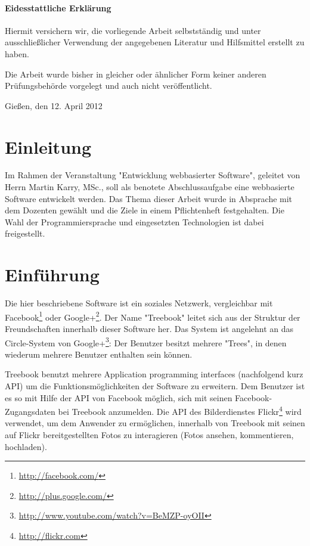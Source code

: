 \documentclass[10pt,a4paper]{book}
\begin{document}
\begin{titlepage}
\subsubsection{Eidesstattliche Erklärung}
Hiermit versichern wir, die vorliegende Arbeit selbstständig und unter ausschließlicher Verwendung der angegebenen Literatur und Hilfsmittel erstellt zu haben.

Die Arbeit wurde bisher in gleicher oder ähnlicher Form keiner anderen Prüfungsbehörde vorgelegt und auch nicht veröffentlicht.

\bigskip
\bigskip
\bigskip
\bigskip
\bigskip
Gießen, den 12. April 2012
\end{titlepage}
\setcounter{page}{1}

\tableofcontents
\renewcommand{\chaptername}{}
\renewcommand{\thechapter}{}
\renewcommand{\thesection}{\arabic{section}}
\renewcommand{\thefigure}{\arabic{figure}}

\chapter{Einleitung}
Im Rahmen der Veranstaltung "Entwicklung webbasierter Software", geleitet von Herrn Martin Karry, MSc., soll als benotete Abschlussaufgabe eine webbasierte Software entwickelt werden. Das Thema dieser Arbeit wurde in Absprache mit dem Dozenten gewählt und die Ziele in einem Pflichtenheft festgehalten. Die Wahl der Programmiersprache und eingesetzten Technologien ist dabei freigestellt.
\chapter{Einführung}
Die hier beschriebene Software ist ein soziales Netzwerk, vergleichbar mit Facebook\footnote{\href{http://facebook.com/}{http://facebook.com/}
} oder Google+\footnote{\href{http://plus.google.com/}{http://plus.google.com/}}. Der Name "Treebook" leitet sich aus der Struktur der 
Freundschaften innerhalb dieser Software her. Das System ist angelehnt an das Circle-System von Google+\footnote{\href{http://www.youtube.
com/watch?v=BeMZP-oyOII}{http://www.youtube.com/watch?v=BeMZP-oyOII}}: Der Benutzer besitzt mehrere "Trees", in denen wiederum 
mehrere Benutzer enthalten sein können.

Treebook benutzt mehrere Application programming interfaces (nachfolgend kurz API) um die Funktionsmöglichkeiten der Software zu erweitern. 
Dem Benutzer ist es so mit Hilfe der API von Facebook möglich, sich mit seinen Facebook-Zugangsdaten bei Treebook anzumelden. Die API des 
Bilderdienstes Flickr\footnote{\href{http://flickr.com}{http://flickr.com}} wird verwendet, um dem Anwender zu ermöglichen, innerhalb von 
Treebook mit seinen auf Flickr bereitgestellten Fotos zu interagieren (Fotos ansehen, kommentieren, hochladen).
\end{document}

